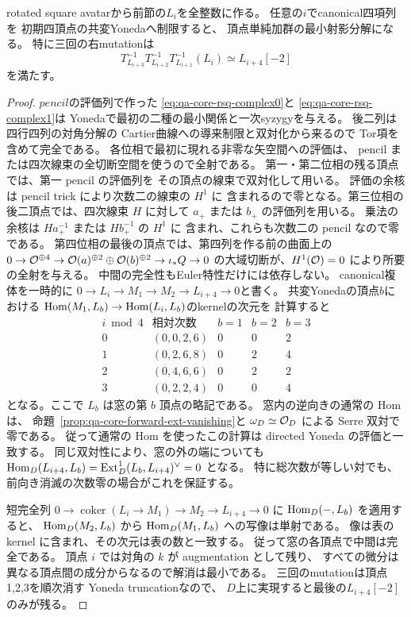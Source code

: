 \begin{lemma}
\label{lem:qa-as-canonical-truncation}
rotated square avatarから前節の$L_i$を全整数に作る。
任意の$i$でcanonical四項列を
初期四頂点の共変Yonedaへ制限すると、
頂点単純加群の最小射影分解になる。
特に三回の右mutationは
\begin{equation}
T^{-1}_{L_{i+3}}T^{-1}_{L_{i+2}}T^{-1}_{L_{i+1}}(L_i)
 \simeq L_{i+4}[-2]
\label{eq:qa-as-canonical-mutation}
\end{equation}
を満たす。
\end{lemma}
\begin{proof}
$pencil$の評価列で作った
\eqref{eq:qa-core-rsq-complex0}と
\eqref{eq:qa-core-rsq-complex1}は
Yonedaで最初の二種の最小関係と一次syzygyを与える。
後二列は四行四列の対角分解の
Cartier曲線への導来制限と双対化から来るので
Tor項を含めて完全である。
各位相で最初に現れる非零な矢空間への評価は、
pencil または四次線束の全切断空間を使うので全射である。
第一・第二位相の残る頂点では、第一 pencil の評価列を
その頂点の線束で双対化して用いる。
評価の余核は pencil trick により次数二の線束の $H^1$ に
含まれるので零となる。第三位相の後二頂点では、四次線束 $H$
に対して $a_+$ または $b_+$ の評価列を用いる。
乗法の余核は $H a_+^{-1}$ または $H b_+^{-1}$ の $H^1$ に
含まれ、これらも次数二の pencil なので零である。
第四位相の最後の頂点では、第四列を作る前の曲面上の
$0\to\mathcal O^{\oplus4}\to\mathcal O(a)^{\oplus2}\oplus\mathcal O(b)^{\oplus2}
 \to\iota_*Q\to0$
の大域切断が、$H^1(\mathcal O)=0$ により所要の全射を与える。
中間の完全性もEuler特性だけには依存しない。
canonical複体を一時的に
$0\to L_i\to M_1\to M_2\to L_{i+4}\to0$と書く。
共変Yonedaの頂点$b$における
$\operatorname{Hom}(M_1,L_b)\to\operatorname{Hom}(L_i,L_b)$のkernelの次元を
計算すると
\[
\begin{array}{c|c|ccc}
i\bmod4&\text{相対次数}&b=1&b=2&b=3\\ \hline
0&(0,0,2,6)&0&0&2\\
1&(0,2,6,8)&0&2&4\\
2&(0,4,6,6)&0&2&2\\
3&(0,2,2,4)&0&0&4
\end{array}
\]
となる。ここで $L_b$ は窓の第 $b$ 頂点の略記である。
窓内の逆向きの通常の Hom は、
命題~\ref{prop:qa-core-forward-ext-vanishing}と
$\omega_D\simeq\mathcal O_D$ による Serre 双対で零である。
従って通常の Hom を使ったこの計算は directed Yoneda の評価と一致する。
同じ双対性により、窓の外の端についても
$\operatorname{Hom}_D(L_{i+4},L_b)=\operatorname{Ext}_D^1(L_b,L_{i+4})^\vee=0$ となる。
特に総次数が等しい対でも、前向き消滅の次数零の場合がこれを保証する。

短完全列 $0\to\operatorname{coker}(L_i\to M_1)\to
M_2\to L_{i+4}\to0$ に $\operatorname{Hom}_D(-,L_b)$ を適用すると、
$\operatorname{Hom}_D(M_2,L_b)$ から $\operatorname{Hom}_D(M_1,L_b)$ への写像は単射である。
像は表の kernel に含まれ、その次元は表の数と一致する。
従って窓の各頂点で中間は完全である。
頂点 $i$ では対角の $k$ が augmentation として残り、
すべての微分は異なる頂点間の成分からなるので解消は最小である。
三回のmutationは頂点1,2,3を順次消す
Yoneda truncationなので、
$D$上に実現すると最後の$L_{i+4}[-2]$のみが残る。
\end{proof}

